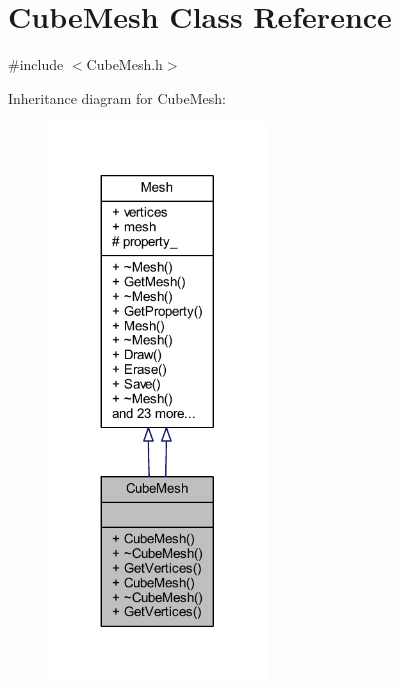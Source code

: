 \hypertarget{class_cube_mesh}{}\section{Cube\+Mesh Class Reference}
\label{class_cube_mesh}


{\ttfamily \#include $<$Cube\+Mesh.\+h$>$}



Inheritance diagram for Cube\+Mesh\+:\nopagebreak
\begin{figure}[H]
\begin{center}
\leavevmode
\includegraphics[width=164pt]{class_cube_mesh__inherit__graph}
\end{center}
\end{figure}


